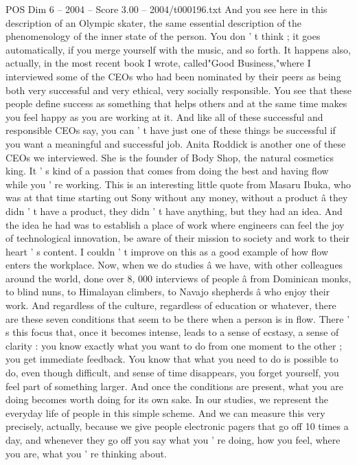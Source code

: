 \begin{textsample}{POS Dim 6 – 2004 – Score 3.00 – 2004/t000196.txt}
And you see here in this description of an Olympic skater, the same essential description of the phenomenology of the inner state of the person.
You don ' t think ; it goes automatically, if you merge yourself with the music, and so forth.
It happens also, actually, in the most recent book I wrote, called"Good Business,"where I interviewed some of the CEOs who had been nominated by their peers as being both very successful and very ethical, very socially responsible.
You see that these people define success as something that helps others and at the same time makes you feel happy as you are working at it.
And like all of these successful and responsible CEOs say, you can ' t have just one of these things be successful if you want a meaningful and successful job.
Anita Roddick is another one of these CEOs we interviewed.
She is the founder of Body Shop, the natural cosmetics king.
It ' s kind of a passion that comes from doing the best and having flow while you ' re working.
This is an interesting little quote from Masaru Ibuka, who was at that time starting out Sony without any money, without a product â they didn ' t have a product, they didn ' t have anything, but they had an idea.
And the idea he had was to establish a place of work where engineers can feel the joy of technological innovation, be aware of their mission to society and work to their heart ' s content.
I couldn ' t improve on this as a good example of how flow enters the workplace.
Now, when we do studies â we have, with other colleagues around the world, done over 8, 000 interviews of people â from Dominican monks, to blind nuns, to Himalayan climbers, to Navajo shepherds â who enjoy their work.
And regardless of the culture, regardless of education or whatever, there are these seven conditions that seem to be there when a person is in flow.
There ' s this focus that, once it becomes intense, leads to a sense of ecstasy, a sense of clarity : you know exactly what you want to do from one moment to the other ; you get immediate feedback.
You know that what you need to do is possible to do, even though difficult, and sense of time disappears, you forget yourself, you feel part of something larger.
And once the conditions are present, what you are doing becomes worth doing for its own sake.
In our studies, we represent the everyday life of people in this simple scheme.
And we can measure this very precisely, actually, because we give people electronic pagers that go off 10 times a day, and whenever they go off you say what you ' re doing, how you feel, where you are, what you ' re thinking about.

\end{textsample}

